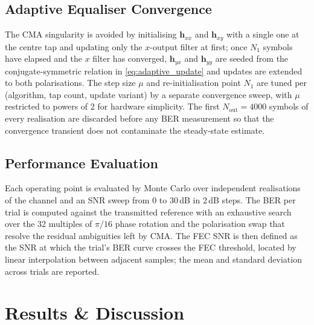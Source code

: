 \documentclass[12pt,a4paper]{article}
\begin{document}
\subsection{Adaptive Equaliser Convergence}
The CMA singularity is avoided by initialising $\mathbf{h}_{xx}$ and $\mathbf{h}_{xy}$ with a single one at the centre tap and updating only the $x$-output filter at first; once $N_1$ symbols have elapsed and the $x$ filter has converged, $\mathbf{h}_{yx}$ and $\mathbf{h}_{yy}$ are seeded from the conjugate-symmetric relation in \cref{eq:adaptive_update} and updates are extended to both polarisations. The step size $\mu$ and re-initialisation point $N_1$ are tuned per (algorithm, tap count, update variant) by a separate convergence sweep, with $\mu$ restricted to powers of 2 for hardware simplicity. The first $N_\mathrm{out} = 4000$ symbols of every realisation are discarded before any BER measurement so that the convergence transient does not contaminate the steady-state estimate.

\subsection{Performance Evaluation}
Each operating point is evaluated by Monte Carlo over independent realisations of the channel and an SNR sweep from 0 to 30\,dB in 2\,dB steps. The BER per trial is computed against the transmitted reference with an exhaustive search over the 32 multiples of $\pi/16$ phase rotation and the polarisation swap that resolve the residual ambiguities left by CMA. The FEC SNR is then defined as the SNR at which the trial's BER curve crosses the FEC threshold, located by linear interpolation between adjacent samples; the mean and standard deviation across trials are reported.
\section{Results \& Discussion}
\end{document}
